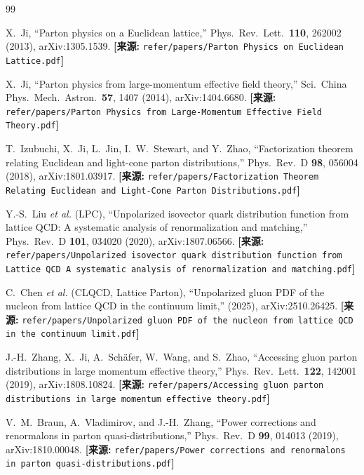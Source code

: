 \documentclass[12pt,a4paper]{ctexart}
\theoremstyle{definition}
\begin{document}
\begin{thebibliography}{99}

X.~Ji,
``Parton physics on a Euclidean lattice,''
Phys.\ Rev.\ Lett.\ \textbf{110}, 262002 (2013), arXiv:1305.1539.
\quad\textbf{[来源:} \texttt{refer/papers/Parton Physics on Euclidean Lattice.pdf}\textbf{]}

X.~Ji,
``Parton physics from large-momentum effective field theory,''
Sci.\ China Phys.\ Mech.\ Astron.\ \textbf{57}, 1407 (2014), arXiv:1404.6680.
\quad\textbf{[来源:} \texttt{refer/papers/Parton Physics from Large-Momentum Effective Field Theory.pdf}\textbf{]}

T.~Izubuchi, X.~Ji, L.~Jin, I.~W.~Stewart, and Y.~Zhao,
``Factorization theorem relating Euclidean and light-cone parton distributions,''
Phys.\ Rev.\ D \textbf{98}, 056004 (2018), arXiv:1801.03917.
\quad\textbf{[来源:} \texttt{refer/papers/Factorization Theorem Relating Euclidean and Light-Cone Parton Distributions.pdf}\textbf{]}

Y.-S.~Liu \textit{et al.} (LPC),
``Unpolarized isovector quark distribution function from lattice QCD: A systematic analysis of renormalization and matching,''
Phys.\ Rev.\ D \textbf{101}, 034020 (2020), arXiv:1807.06566.
\quad\textbf{[来源:} \texttt{refer/papers/Unpolarized isovector quark distribution function from Lattice QCD A systematic analysis of renormalization and matching.pdf}\textbf{]}

C.~Chen \textit{et al.} (CLQCD, Lattice Parton),
``Unpolarized gluon PDF of the nucleon from lattice QCD in the continuum limit,''
(2025), arXiv:2510.26425.
\quad\textbf{[来源:} \texttt{refer/papers/Unpolarized gluon PDF of the nucleon from lattice QCD in the continuum limit.pdf}\textbf{]}

J.-H.~Zhang, X.~Ji, A.~Sch\"afer, W.~Wang, and S.~Zhao,
``Accessing gluon parton distributions in large momentum effective theory,''
Phys.\ Rev.\ Lett.\ \textbf{122}, 142001 (2019), arXiv:1808.10824.
\quad\textbf{[来源:} \texttt{refer/papers/Accessing gluon parton distributions in large momentum effective theory.pdf}\textbf{]}

V.~M.~Braun, A.~Vladimirov, and J.-H.~Zhang,
``Power corrections and renormalons in parton quasi-distributions,''
Phys.\ Rev.\ D \textbf{99}, 014013 (2019), arXiv:1810.00048.
\quad\textbf{[来源:} \texttt{refer/papers/Power corrections and renormalons in parton quasi-distributions.pdf}\textbf{]}


\end{thebibliography}
\end{document}
